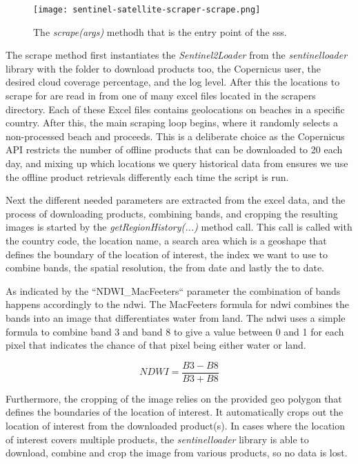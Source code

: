 \begin{figure}[h!]
    \centering
    \texttt{[image: sentinel-satellite-scraper-scrape.png]}
    \caption{The \emph{scrape(args)} methodh that is the entry point of the \acrshort{sss}.}
    \label{fig:sentinel-satellite-scraper-scrape}
\end{figure}

The scrape method first instantiates the \emph{Sentinel2Loader} from the \emph{sentinelloader} library with the folder to download products too, the Copernicus user, the desired cloud coverage percentage, and the log level. After this the locations to scrape for are read in from one of many excel files located in the scrapers directory. Each of these Excel files contains geolocations on beaches in a specific country. After this, the main scraping loop begins, where it randomly selects a non-processed beach and proceeds. This is a deliberate choice as the Copernicus API restricts the number of offline products that can be downloaded to 20 each day, and mixing up which locations we query historical data from ensures we use the offline product retrievals differently each time the script is run.

Next the different needed parameters are extracted from the excel data, and the process of downloading products, combining bands, and cropping the resulting images is started by the \emph{getRegionHistory(...)} method call. This call is called with the country code, the location name, a search area which is a geoshape that defines the boundary of the location of interest, the index we want to use to combine bands, the spatial resolution, the from date and lastly the to date.

As indicated by the ``NDWI\_MacFeeters`` parameter the combination of bands happens accordingly to the \acrfull{ndwi}. The MacFeeters formula for \acrshort{ndwi} combines the bands into an image that differentiates water from land. The \acrshort{ndwi} uses a simple formula to combine band 3 and band 8 to give a value between 0 and 1 for each pixel that indicates the chance of that pixel being either water or land.

\[ NDWI = \dfrac{B3 - B8}{B3 + B8} \]

Furthermore, the cropping of the image relies on the provided geo polygon that defines the boundaries of the location of interest. It automatically crops out the location of interest from the downloaded product(s). In cases where the location of interest covers multiple products, the \emph{sentinelloader} library is able to download, combine and crop the image from various products, so no data is lost.

